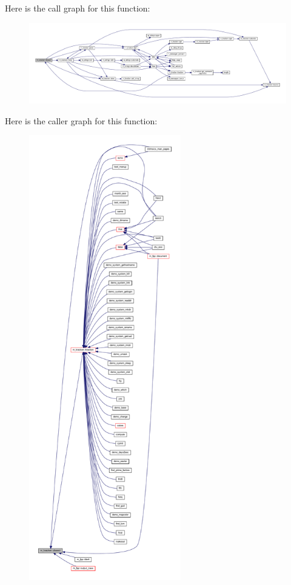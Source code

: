 Here is the call graph for this function\+:
\nopagebreak
\begin{figure}[H]
\begin{center}
\leavevmode
\includegraphics[width=350pt]{namespacem__kracken_a2cb376f8a8e26e489a45cafcda66ea3e_cgraph}
\end{center}
\end{figure}
Here is the caller graph for this function\+:
\nopagebreak
\begin{figure}[H]
\begin{center}
\leavevmode
\includegraphics[height=550pt]{namespacem__kracken_a2cb376f8a8e26e489a45cafcda66ea3e_icgraph}
\end{center}
\end{figure}
\mbox{\label{namespacem__kracken_a4c509f8594be3b73928c43c961c1caf4}} 
